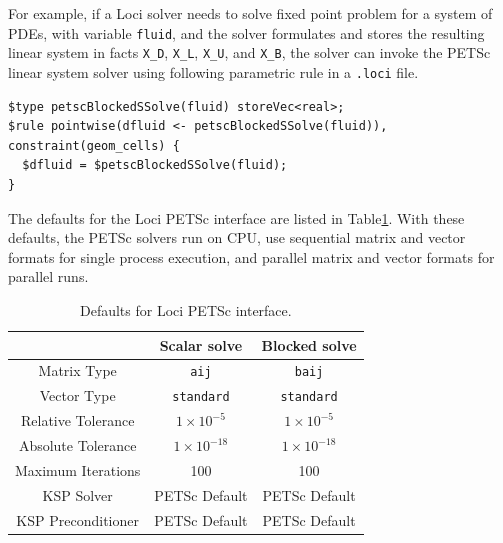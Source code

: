 \documentclass{article}
\begin{document}
For example, if a Loci solver needs to solve fixed point problem for a
system of PDEs, with variable \texttt{fluid}, and the solver
formulates and stores the resulting linear system in facts
\texttt{X\_D}, \texttt{X\_L}, \texttt{X\_U}, and \texttt{X\_B}, the
solver can invoke the PETSc linear system solver using following
parametric rule in a \texttt{.loci} file.
\begin{verbatim}
$type petscBlockedSSolve(fluid) storeVec<real>;
$rule pointwise(dfluid <- petscBlockedSSolve(fluid)), constraint(geom_cells) {
  $dfluid = $petscBlockedSSolve(fluid);
}
\end{verbatim}
The defaults for the Loci PETSc interface are listed in
Table\ref{tbl:Loci-PETSc-Defaults}.  With these defaults, the PETSc
solvers run on CPU, use sequential matrix and vector formats for
single process execution, and parallel matrix and vector formats for
parallel runs.
\begin{table}[H]
    \centering
    \begin{tabular}{c|c|c}
         & Scalar solve & Blocked solve \\
         \hline
        Matrix Type & \texttt{aij} & \texttt{baij} \\
        Vector Type & \texttt{standard} & \texttt{standard} \\
        Relative Tolerance & $1\times10^{-5}$ & $1\times10^{-5}$ \\
        Absolute Tolerance & $1\times10^{-18}$ & $1\times10^{-18}$ \\
        Maximum Iterations & 100 & 100 \\
        KSP Solver & PETSc Default & PETSc Default \\
        KSP Preconditioner & PETSc Default & PETSc Default \\
    \end{tabular}
    \caption{Defaults for Loci PETSc interface.}
    \label{tbl:Loci-PETSc-Defaults}
\end{table}
\end{document}
